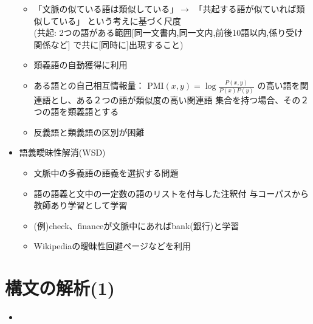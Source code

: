 \documentclass[a4j,11pt]{jsarticle}
\begin{document}
\begin{itemize}
\begin{itemize}
	\item 「文脈の似ている語は類似している」$\rightarrow$
	      「共起する語が似ていれば類似している」
	      という考えに基づく尺度\\
	      (共起: 2つの語がある範囲[同一文書内,同一文内,前後10語以内,係り受け関係など]
	      で共に[同時に]出現すること)
	\item 類義語の自動獲得に利用
	\item ある語との自己相互情報量：
	      $\mathrm{PMI}(x,y) = \log{\frac{P(x,y)}{P(x)P(y)}}$
	      の高い語を関連語とし、ある２つの語が類似度の高い関連語
	      集合を持つ場合、その２つの語を類義語とする
	\item 反義語と類義語の区別が困難
       \end{itemize}
 \item 語義曖昧性解消(WSD)
       \begin{itemize}
	\item 文脈中の多義語の語義を選択する問題
	\item 語の語義と文中の一定数の語のリストを付与した注釈付
	      与コーパスから教師あり学習として学習
	\item (例)check、financeが文脈中にあればbank(銀行)と学習
	\item Wikipediaの曖昧性回避ページなどを利用
       \end{itemize}
\end{itemize}

\section{構文の解析(1)}
\begin{itemize}
 \item 
\end{itemize}
\end{document}
